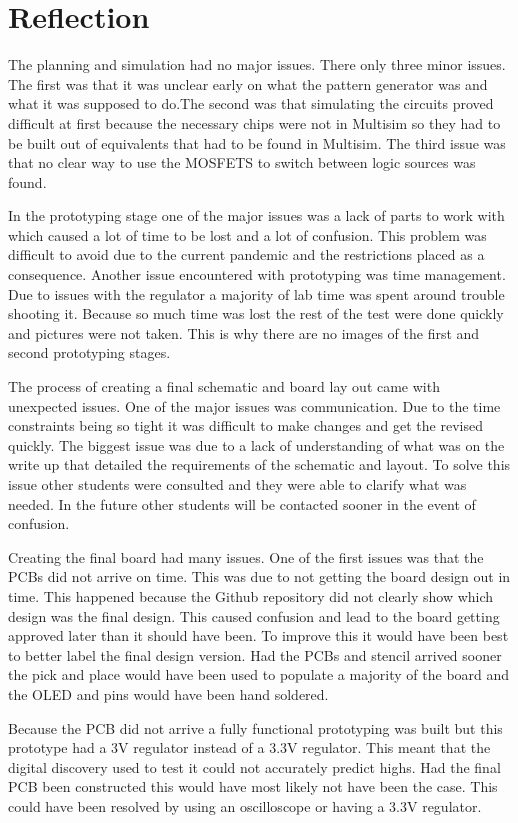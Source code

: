 \documentclass[12pt]{article}
\begin{document}
    \section{Reflection}
    The planning and simulation had no major issues. There only three minor issues. The first was that it was unclear early on what the pattern generator was and what it was supposed to do.The second was that simulating the circuits proved difficult at first because the necessary chips were not in Multisim so they had to be built out of equivalents that had to be found in Multisim. The third issue was that no clear way to use the MOSFETS to switch between logic sources was found.
    \par In the prototyping stage one of the major issues was a lack of parts to work with which caused a lot of time to be lost and a lot of confusion. This problem was difficult to avoid due to the current pandemic and the restrictions placed as a consequence. Another issue encountered with prototyping was time management. Due to issues with the regulator a majority of lab time was spent around trouble shooting it. Because so much time was lost the rest of the test were done quickly and pictures were not taken. This is why there are no images of the first and second prototyping stages.
    \par The process of creating a final schematic and board lay out came with unexpected issues. One of the major issues was communication. Due to the time constraints being so tight it was difficult to make changes and get the revised quickly. The biggest issue was due to a lack of understanding of what was on the write up that detailed the requirements of the schematic and layout. To solve this issue other students were consulted and they were able to clarify what was needed. In the future other students will be contacted sooner in the event of confusion.
    \par Creating the final board had many issues. One of the first issues was that the PCBs did not arrive on time. This was due to not getting the board design out in time. This happened because the Github repository did not clearly show which design was the final design. This caused confusion and lead to the board getting approved later than it should have been. To improve this it would have been best to better label the final design version.
    Had the PCBs and stencil arrived sooner the pick and place would have been used to populate a majority of the board and the OLED and pins would have been hand soldered.
    \par Because the PCB did not arrive a fully functional prototyping was built but this prototype had a 3V regulator instead of a 3.3V regulator. This meant that the digital discovery used to test it could not accurately predict highs. Had the final PCB been constructed this would have most likely not have been the case. This could have been resolved by using an oscilloscope or having a 3.3V regulator.
\end{document}
